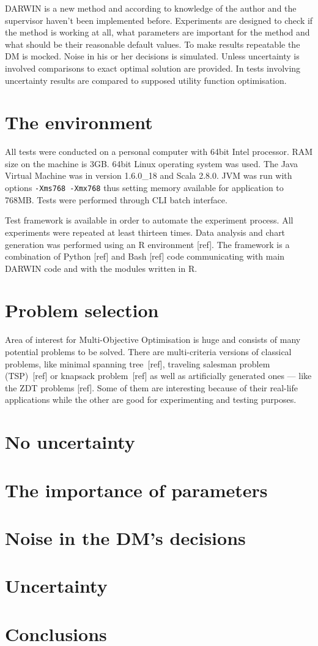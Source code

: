 DARWIN is a new method and according to knowledge of the author and the
supervisor haven't been implemented before. Experiments are
designed to check if the method is working at all, what parameters are important
for the method and what should be their reasonable default values. To make
results repeatable the DM is mocked. Noise in his or her decisions is
simulated. Unless uncertainty is involved comparisons to exact optimal
solution are provided. In tests involving uncertainty results are compared to
supposed utility function optimisation. 

\section{The environment}

All tests were conducted on a personal computer with 64bit Intel
processor. RAM size on the machine is 3GB. 64bit Linux operating system was
used. The Java Virtual Machine was in version 1.6.0\_18 and Scala 2.8.0. JVM
was run with options \texttt{-Xms768 -Xmx768} thus setting memory available
for application to 768MB. Tests were performed through CLI batch interface.

Test framework is available in order to automate the experiment process. All
experiments were repeated at least thirteen times. Data analysis and chart
generation was performed using an R environment [ref]. The framework is a
combination of Python [ref] and Bash [ref] code communicating with main DARWIN
code and with the modules written in R.

\section{Problem selection}

Area of interest for Multi-Objective Optimisation is huge and consists of many
potential problems to be solved. There are multi-criteria versions of
classical problems, like minimal spanning tree~[ref], traveling salesman
problem (TSP)~[ref] or knapsack problem~[ref] as well as artificially
generated ones --- like the ZDT problems [ref]. Some of them are interesting
because of their real-life applications while the other are good for
experimenting and testing purposes.



\section{No uncertainty}

\section{The importance of parameters}

\section{Noise in the DM's decisions}

\section{Uncertainty}

\section{Conclusions}

